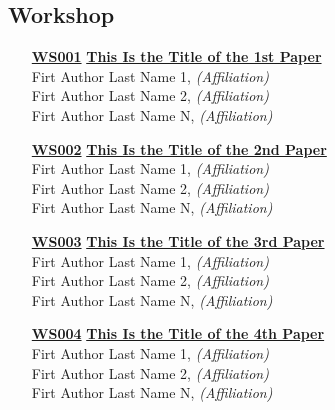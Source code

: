 \subsection{Workshop}
\begin{enumerate}
\item[\href{https://doi.org/10.1145/1122445.1122456}{\textbf{WS001}}]
\href{https://doi.org/10.1145/1122445.1122456}{\textbf{This Is the Title of the 1st Paper}}\\
Firt Author Last Name 1, \emph{(Affiliation)}\\
Firt Author Last Name 2, \emph{(Affiliation)}\\
Firt Author Last Name N, \emph{(Affiliation)}\\

\item[\href{https://doi.org/10.1145/1122445.1122456}{\textbf{WS002}}]
\href{https://doi.org/10.1145/1122445.1122456}{\textbf{This Is the Title of the 2nd Paper}}\\
Firt Author Last Name 1, \emph{(Affiliation)}\\
Firt Author Last Name 2, \emph{(Affiliation)}\\
Firt Author Last Name N, \emph{(Affiliation)}\\

\item[\href{https://doi.org/10.1145/1122445.1122456}{\textbf{WS003}}]
\href{https://doi.org/10.1145/1122445.1122456}{\textbf{This Is the Title of the 3rd Paper}}\\
Firt Author Last Name 1, \emph{(Affiliation)}\\
Firt Author Last Name 2, \emph{(Affiliation)}\\
Firt Author Last Name N, \emph{(Affiliation)}\\

\item[\href{https://doi.org/10.1145/1122445.1122456}{\textbf{WS004}}]
\href{https://doi.org/10.1145/1122445.1122456}{\textbf{This Is the Title of the 4th Paper}}\\
Firt Author Last Name 1, \emph{(Affiliation)}\\
Firt Author Last Name 2, \emph{(Affiliation)}\\
Firt Author Last Name N, \emph{(Affiliation)}\\
\end{enumerate}